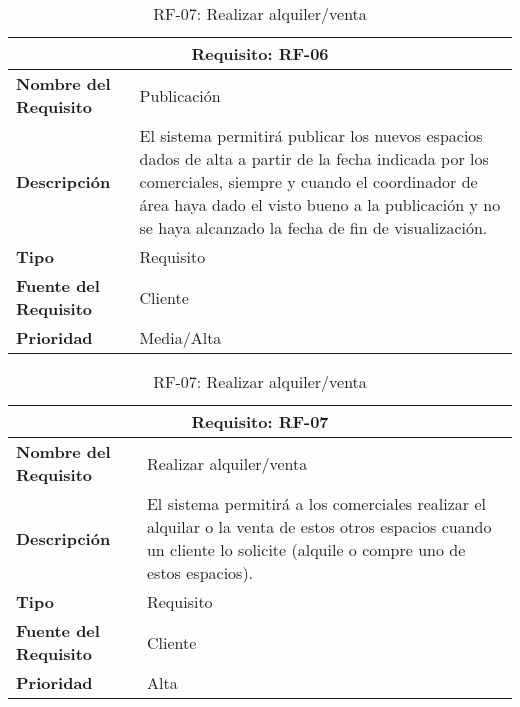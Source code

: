 \begin{table}[H]
\begin{table}[H]
\begin{center}
\begin{tabular}{p{} p{7cm}}
\multicolumn{2}{c}{\textbf{Requisito: RF-06} } \\
\hline \hline
\textbf{Nombre del Requisito} & Publicación  \\
\hline
\textbf{Descripción} & El sistema permitirá publicar los nuevos espacios dados de alta a partir de la fecha indicada por los comerciales, siempre y cuando el coordinador de área haya dado el visto bueno a la publicación y no se haya alcanzado la fecha de fin de visualización. \\
\hline
\textbf{Tipo} & Requisito  \\
\hline
\textbf{Fuente del Requisito} & Cliente  \\
\hline
\textbf{Prioridad} & Media/Alta  \\ \hline
\end{tabular}
\caption{RF-06: Publicación}
\label{tab:RF-06}
\end{center}
\end{table}

\begin{table}[H]
\begin{center}
\begin{tabular}{p{} p{7cm}}
\multicolumn{2}{c}{\textbf{Requisito: RF-07} } \\
\hline \hline
\textbf{Nombre del Requisito} & Realizar alquiler/venta  \\
\hline
\textbf{Descripción} & El sistema permitirá a los comerciales realizar el alquilar o la venta de estos otros espacios cuando un cliente lo solicite (alquile o compre uno de estos espacios). \\
\hline
\textbf{Tipo} & Requisito  \\
\hline
\textbf{Fuente del Requisito} &  Cliente \\
\hline
\textbf{Prioridad} & Alta \\ \hline
\end{tabular}
\caption{RF-07: Realizar alquiler/venta}
\label{tab:RF-07}
\end{center}
\end{table}


\end{table}
